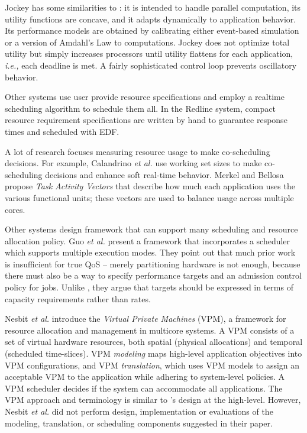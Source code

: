 Jockey\cite{Jockey} has some similarities to \pacora: it is intended to handle parallel computation, its utility functions are concave,
and it adapts dynamically to application behavior.
Its performance models are obtained by calibrating either event-based simulation or a version of Amdahl's Law to computations.
Jockey does not optimize total utility but simply increases processors until utility flattens for each application,
\emph{i.e.,} each deadline is met.
A fairly sophisticated control loop prevents oscillatory behavior.

Other systems use user provide resource specifications and employ a realtime scheduling algorithm to schedule them all.  In the Redline system\cite{Redline}, compact resource requirement specifications are written by hand to guarantee response times and scheduled with EDF.

A lot of research focuses measuring resource usage to make co-scheduling decisions.
For example, Calandrino \emph{et al.}\cite{unc} use working set sizes to make co-scheduling decisions and enhance soft real-time behavior. Merkel and Bellosa\cite{merkel-eurosys08} propose \emph{Task Activity Vectors} that describe how much each application uses the various functional units; these vectors are used to balance usage across multiple cores.

Other systems design framework that can support many scheduling and resource allocation policy. Guo \emph{et al.}\cite{1331730} present a framework that incorporates a scheduler which supports multiple execution modes.  They point out that much prior work is insufficient for true QoS -- merely partitioning hardware is not enough, because there must also be a way to specify performance targets and an admission control policy for jobs. Unlike \pacora, they argue that targets should be expressed in terms of capacity requirements rather than rates.

Nesbit \emph{et al.}\cite{1436097} introduce the \emph{Virtual Private Machines} (VPM), a framework for resource allocation and management in multicore systems. A VPM consists of a set of virtual hardware resources, both spatial (physical allocations) and temporal (scheduled time-slices).  
VPM {\em modeling} maps high-level application objectives into VPM configurations, and VPM {\em translation}, which uses VPM models to assign an acceptable VPM to the application while adhering to system-level policies. A VPM scheduler decides if the system can accommodate all applications. The VPM approach and terminology is similar to \pacora's design at the high-level.  However, Nesbit \emph{et al.} did not perform design, implementation or evaluations of the modeling, translation, or scheduling components suggested in their paper.

